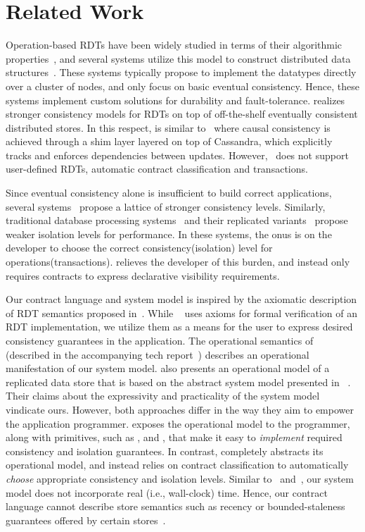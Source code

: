 \section{Related Work}
\label{sec:related}

Operation-based RDTs have been widely studied in terms of their algorithmic
properties~\cite{SSS,Burckhardt2014}, and several systems utilize this model to
construct distributed data structures~\cite{Cassandra,Bayou,Tango}. These
systems typically propose to implement the datatypes directly over a cluster of
nodes, and only focus on basic eventual consistency. Hence, these systems
implement custom solutions for durability and fault-tolerance. \name realizes
stronger consistency models for RDTs on top of off-the-shelf eventually consistent
distributed stores. In this respect, \name is similar to~\cite{BoltOn} where
causal consistency is achieved through a shim layer layered on top of Cassandra, which
explicitly tracks and enforces dependencies between updates.
However,~\cite{BoltOn} does not support user-defined RDTs, automatic contract
classification and transactions.

Since eventual consistency alone is insufficient to build correct applications,
several systems~\cite{Bayou,Pileus,RedBlue} propose a lattice of stronger
consistency levels. Similarly, traditional database processing
systems~\cite{Berenson95} and their replicated variants~\cite{BailisHAT}
propose weaker isolation levels for performance. In these systems, the onus is
on the developer to choose the correct consistency(isolation) level for
operations(transactions). \name relieves the developer of this burden, and
instead only requires contracts to express declarative visibility requirements.

Our contract language and system model is inspired by the axiomatic
description of RDT semantics proposed in~\cite{Burckhardt2014}. While
~\cite{Burckhardt2014} uses axioms for formal verification of
an RDT implementation, we utilize them as a means for the user to express
desired consistency guarantees in the application. The operational semantics
of \name (described in the accompanying tech report~\cite{techrep}) describes
an operational manifestation of our system model. \cite{Burckhardt2015} also
presents an operational model of a replicated data store that is based on
the abstract system model presented in ~\cite{Burckhardt2014}. Their claims
about the expressivity and practicality of the system model vindicate
ours. However, both approaches differ in the way they aim to empower the application
programmer. \cite{Burckhardt2015} exposes the operational model to the
programmer, along with primitives, such as , 
and , that make it easy to \emph{implement} required
consistency and isolation guarantees. In contrast, \name completely
abstracts its operational model, and instead relies on contract
classification to automatically \emph{choose} appropriate consistency and isolation
levels. Similar to~\cite{Burckhardt2014} and~\cite{Burckhardt2015}, our
system model does not incorporate real (i.e., wall-clock) time. Hence, our
contract language cannot describe store semantics such as recency or
bounded-staleness guarantees offered by certain stores~\cite{Pileus}.

